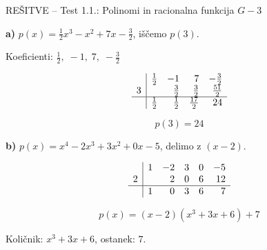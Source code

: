 \documentclass[a4paper,12pt]{letter}
\begin{document}
\newpage


\newpage
\begin{minipage}{20cm}
\begin{bclogo}[couleur=brown!40,
  arrondi=0,ombre=true, couleurOmbre=gray!50,
logo =\bcplume,
  noborder=true]
{\textrm{{\Large RE\v{S}ITVE -- Test 1.1.:}
\large{ Polinomi in racionalna funkcija} \hfill $G-3$}}
\end{bclogo}
\end{minipage}
 
\begin{resitev*}
 
\textbf{a)} $p(x)=\tfrac{1}{2}x^3-x^2+7x-\tfrac{3}{2}$, \quad i\v{s}\v{c}emo $p(3)$.
 
Koeficienti: $\tfrac{1}{2},\; -1,\; 7,\; -\tfrac{3}{2}$
 
\[
\begin{array}{r|rrrr}
   & \tfrac{1}{2} & -1 & 7 & -\tfrac{3}{2} \\
 3 &              & \tfrac{3}{2} & \tfrac{3}{2} & \tfrac{51}{2} \\
\hline
   & \tfrac{1}{2} & \tfrac{1}{2} & \tfrac{17}{2} & 24
\end{array}
\]
 
$$\boxed{p(3) = 24}$$
 
\textbf{b)} $p(x)=x^4-2x^3+3x^2+0x-5$, \quad delimo z $(x-2)$.
 
\[
\begin{array}{r|rrrrr}
   & 1 & -2 & 3 & 0 & -5 \\
 2 &   &  2 & 0 & 6 & 12 \\
\hline
   & 1 &  0 & 3 & 6 &  7
\end{array}
\]
 
$$p(x) = (x-2)(x^3+3x+6)+7$$
 
Koli\v{c}nik: $\boxed{x^3+3x+6}$, \quad ostanek: $7$.
 
\end{resitev*}
 
\end{document}
